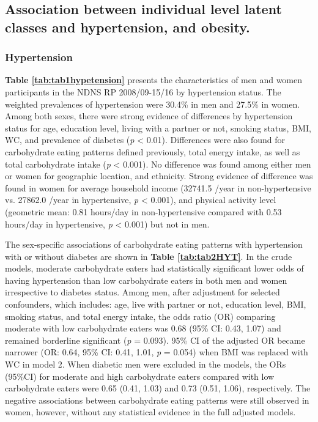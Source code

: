 

\subsection{Association between individual level latent classes and hypertension, and obesity.}\vspace{-0.3cm}

\subsubsection{Hypertension}\vspace{-0.3cm}

\textbf{Table \ref{tab:tab1hypetension}} presents the characteristics of men and women participants in the NDNS RP 2008/09-15/16 by hypertension status. The weighted prevalences of hypertension were 30.4\% in men and 27.5\% in women. Among both sexes, there were strong evidence of differences by hypertension status for age, education level, living with a partner or not, smoking status, BMI, WC, and prevalence of diabetes (\textit{p} < 0.01). Differences were also found for carbohydrate eating patterns defined previously, total energy intake, as well as total carbohydrate intake (\textit{p} < 0.001). No difference was found among either men or women for geographic location, and ethnicity. Strong evidence of difference was found in women for average household income (32741.5 \textsterling/year in non-hypertensive vs. 27862.0 \textsterling/year in hypertensive, \textit{p} < 0.001), and physical activity level (geometric mean: 0.81 hours/day in non-hypertensive compared with 0.53 hours/day in hypertensive, \textit{p} < 0.001) but not in men. 

The sex-specific associations of carbohydrate eating patterns with hypertension with or without diabetes are shown in \textbf{Table \ref{tab:tab2HYT}}. In the crude models, moderate carbohydrate eaters had statistically significant lower odds of having hypertension than low carbohydrate eaters in both men and women irrespective to diabetes status. Among men, after adjustment for selected confounders, which includes: age, live with partner or not, education level, BMI, smoking status, and total energy intake, the odds ratio (OR) comparing moderate with low carbohydrate eaters was 0.68 (95\% CI: 0.43, 1.07) and remained borderline significant (\textit{p} = 0.093). 95\% CI of the adjusted OR became narrower (OR: 0.64, 95\% CI: 0.41, 1.01, \textit{p} = 0.054) when BMI was replaced with WC in model 2. When diabetic men were excluded in the models, the ORs (95\%CI) for moderate and high carbohydrate eaters compared with low carbohydrate eaters were 0.65 (0.41, 1.03) and 0.73 (0.51, 1.06), respectively. The negative associations between carbohydrate eating patterns were still observed in women, however, without any statistical evidence in the full adjusted models. \vspace{-0.3cm}

